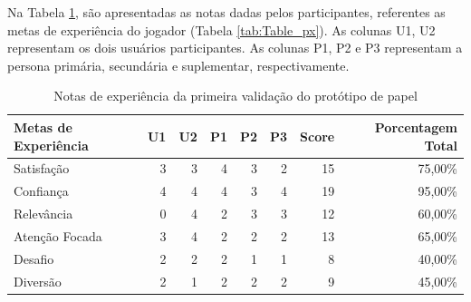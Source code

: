 \begin{apendicesenv}
{Na Tabela \ref{tab:notas-metas-exp-1}, são apresentadas as notas dadas pelos participantes, referentes as metas de experiência do jogador (Tabela \ref{tab:Table_px}). As colunas U1, U2 representam os dois usuários participantes. As colunas P1, P2 e P3 representam a persona primária, secundária e suplementar, respectivamente.

\begin{table}[htbp]
\centering
\caption{\textcolor{textadded}{Notas de experiência da primeira validação do protótipo de papel}}
\begin{tabular}{|p{5cm}|r|r|r|r|r|r|r|}
\hline
\textcolor{textadded}{\textbf{Metas de Experiência}} & \textcolor{textadded}{\textbf{U1}} & \textcolor{textadded}{\textbf{U2}} & \textcolor{textadded}{\textbf{P1}} & \textcolor{textadded}{\textbf{P2}} & \textcolor{textadded}{\textbf{P3}} & \textcolor{textadded}{\textbf{Score}} & \textcolor{textadded}{\textbf{Porcentagem Total}}     \\ \hline
\textcolor{textadded}{Satisfação} & \textcolor{textadded}{3} & \textcolor{textadded}{3} & \textcolor{textadded}{4} & \textcolor{textadded}{3} & \textcolor{textadded}{2} & \textcolor{textadded}{15} & \textcolor{textadded}{75,00\%}         \\ \hline
\textcolor{textadded}{Confiança} & \textcolor{textadded}{4} & \textcolor{textadded}{4} & \textcolor{textadded}{4} & \textcolor{textadded}{3} & \textcolor{textadded}{4} & \textcolor{textadded}{19} & \textcolor{textadded}{95,00\%}          \\ \hline
\textcolor{textadded}{Relevância} & \textcolor{textadded}{0} & \textcolor{textadded}{4} & \textcolor{textadded}{2} & \textcolor{textadded}{3} & \textcolor{textadded}{3} & \textcolor{textadded}{12} & \textcolor{textadded}{60,00\%}         \\ \hline
\textcolor{textadded}{Atenção Focada} & \textcolor{textadded}{3} & \textcolor{textadded}{4} & \textcolor{textadded}{2} & \textcolor{textadded}{2} & \textcolor{textadded}{2} & \textcolor{textadded}{13} & \textcolor{textadded}{65,00\%}     \\ \hline
\textcolor{textadded}{Desafio} & \textcolor{textadded}{2} & \textcolor{textadded}{2} & \textcolor{textadded}{2} & \textcolor{textadded}{1} & \textcolor{textadded}{1} & \textcolor{textadded}{8} & \textcolor{textadded}{40,00\%}             \\ \hline
\textcolor{textadded}{Diversão} & \textcolor{textadded}{2} & \textcolor{textadded}{1} & \textcolor{textadded}{2} & \textcolor{textadded}{2} & \textcolor{textadded}{2} & \textcolor{textadded}{9} & \textcolor{textadded}{45,00\%}            \\ \hline
\end{tabular}
\label{tab:notas-metas-exp-1}
\end{table}

}
\end{apendicesenv}
